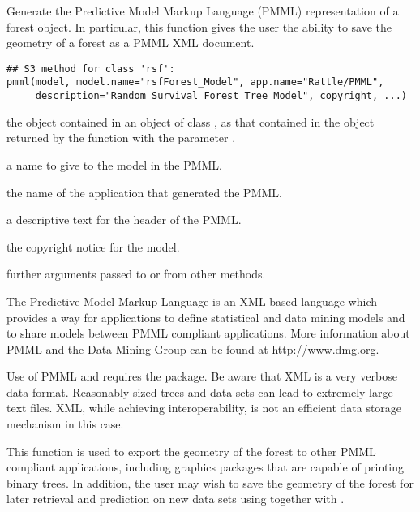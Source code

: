 \begin{Description}\relax
Generate the Predictive Model Markup Language (PMML) representation of
a  forest object.  In particular, this
function gives the user the ability to save the geometry of a forest
as a PMML XML document.
\end{Description}
\begin{Usage}
\begin{verbatim}
## S3 method for class 'rsf':
pmml(model, model.name="rsfForest_Model", app.name="Rattle/PMML",
     description="Random Survival Forest Tree Model", copyright, ...)
\end{verbatim}
\end{Usage}
\begin{Arguments}
\begin{ldescription}
\item[\code{model}] the  object contained in an object of class
, as that contained in the object
returned by the function  with the parameter
.
\item[\code{model.name}] a name to give to the model in the PMML.
\item[\code{app.name}] the name of the application that generated the PMML.
\item[\code{description}] a descriptive text for the header of the PMML.
\item[\code{copyright}] the copyright notice for the model.
\item[\code{...}] further arguments passed to or from other methods.
\end{ldescription}
\end{Arguments}
\begin{Details}\relax
The Predictive Model Markup Language is an XML based language which
provides a way for applications to define statistical and data mining
models and to share models between PMML compliant applications.  More
information about PMML and the Data Mining Group can be found at
http://www.dmg.org.  

Use of PMML and  requires the  package.  Be
aware that XML is a very verbose data format.  Reasonably sized trees
and data sets can lead to extremely large text files.  XML, while
achieving interoperability, is not an efficient data storage mechanism
in this case.

This function is used to export the geometry of the forest to other
PMML compliant applications, including graphics packages that are
capable of printing binary trees.  In addition, the user may wish to
save the geometry of the forest for later retrieval and prediction on
new data sets using  together with .
\end{Details}
